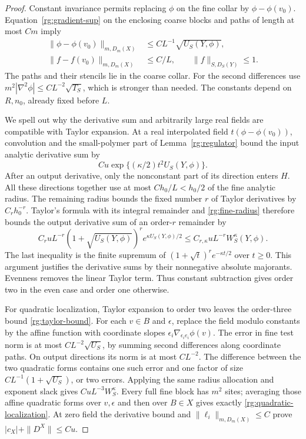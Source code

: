 \begin{proof}
Constant invariance permits replacing $\phi$ on the fine collar by $\phi-\phi(v_0)$.  Equation~\eqref{rg:gradient-sup} on the enclosing coarse blocks and paths of length at most $C m$ imply
\begin{align}
 \|\phi-\phi(v_0)\|_{m,D_m(X)}&\le CL^{-1}\sqrt{U_S(Y,\phi)},\label{rg:fine-radius}\\
 \|f-f(v_0)\|_{m,D_m(X)}&\le C/L,\qquad \|f\|_{S,D_S(Y)}\le1.\nonumber
\end{align}
The paths and their stencils lie in the coarse collar.  For the second differences use $m^2|\nabla^2\phi|\le CL^{-2}\sqrt{T_S}$, which is stronger than needed.  The constants depend on $R,n_0$, already fixed before $L$.

We spell out why the derivative sum and arbitrarily large real fields are compatible with Taylor expansion.  At a real interpolated field $t(\phi-\phi(v_0))$, convolution and the small-polymer part of Lemma~\ref{rg:regulator} bound the input analytic derivative sum by
\[
 C u\exp\{(\kappa/2)t^2U_S(Y,\phi)\}.
\]
After an output derivative, only the nonconstant part of its direction enters $H$.  All these directions together use at most $Ch_0/L<h_0/2$ of the fine analytic radius.  The remaining radius bounds the fixed number $r$ of Taylor derivatives by $C_rh_0^{-r}$.  Taylor's formula with its integral remainder and \eqref{rg:fine-radius} therefore bounds the output derivative sum of an order-$r$ remainder by
\begin{equation}\label{rg:taylor-bound}
 C_ruL^{-r}(1+\sqrt{U_S(Y,\phi)})^r
 e^{\kappa U_S(Y,\phi)/2}\le C_{r,\kappa}uL^{-r}W_S^\kappa(Y,\phi).
\end{equation}
The last inequality is the finite supremum of $(1+\sqrt t)^re^{-\kappa t/2}$ over $t\ge0$.  This argument justifies the derivative sums by their nonnegative absolute majorants.  Evenness removes the linear Taylor term.  Thus constant subtraction gives order two in the even case and order one otherwise.

For quadratic localization, Taylor expansion to order two leaves the order-three bound \eqref{rg:taylor-bound}.  For each $v\in B$ and $\epsilon$, replace the field modulo constants by the affine function with coordinate slopes $\epsilon_i\nabla_{\epsilon_i e_i}\phi(v)$.  The error in fine test norm is at most $CL^{-2}\sqrt{U_S}$, by summing second differences along coordinate paths.  On output directions its norm is at most $CL^{-2}$.  The difference between the two quadratic forms contains one such error and one factor of size $CL^{-1}(1+\sqrt{U_S})$, or two errors.  Applying the same radius allocation and exponent slack gives $CuL^{-3}W_S^\kappa$.  Every full fine block has $m^2$ sites; averaging those affine quadratic forms over $v,\epsilon$ and then over $B\in X$ gives exactly \eqref{rg:quadratic-localization}.  At zero field the derivative bound and $\|\ell_i\|_{m,D_m(X)}\le C$ prove $|c_X|+\|D^X\|\le Cu$.


\end{proof}
